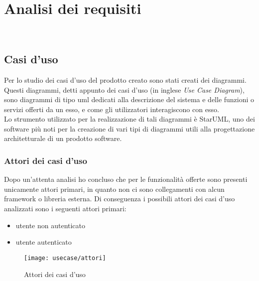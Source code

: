 
\chapter{Analisi dei requisiti}
\label{cap:analisi-requisiti}

\\

\section{Casi d'uso}

Per lo studio dei casi d'uso del prodotto creato sono stati creati dei diagrammi.
Questi diagrammi, detti appunto dei casi d'uso (in inglese \emph{Use Case Diagram}), sono diagrammi di tipo \gls{uml} dedicati alla descrizione del sistema e delle funzioni o servizi offerti da un esso, e come gli utilizzatori interagiscono con esso.\\
Lo strumento utilizzato per la realizzazione di tali diagrammi è StarUML, uno dei software più noti per la creazione di vari tipi di diagrammi utili alla progettazione architetturale di un prodotto software.

\subsection{Attori dei casi d'uso}
Dopo un'attenta analisi ho concluso che per le funzionalità offerte sono presenti unicamente attori primari, in quanto non ci sono collegamenti con alcun framework o libreria esterna.
Di conseguenza i possibili attori dei casi d'uso analizzati sono i seguenti attori primari:
\begin{itemize}
	\item utente non autenticato
	\item utente autenticato
\end{itemize}
\begin{figure}[H] 
	\centering 
	\texttt{[image: usecase/attori]} 
	\caption{Attori dei casi d'uso}
\end{figure}


